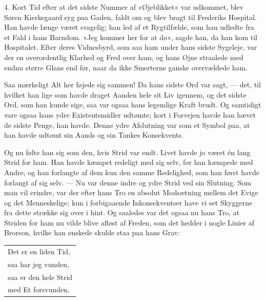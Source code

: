 \documentclass[12pt,a4paper,openany]{book}
\newcommand{\opage}[1]{\marginnote{\footnotesize\textit{[#1]}}}
\begin{document}
4. Kort Tid efter at det sidste Nummer af »Øjeblikket«
var udkommet, blev Søren Kierkegaard syg paa
Gaden, faldt om og blev bragt til Frederiks Hospital.
Han havde længe været svagelig; han led af et Rygtilfælde,
som han udledte fra et Fald i hans Barndom.
»Jeg kommer her for at dø«, sagde han, da han kom til
Hospitalet. Efter deres Vidnesbyrd, som saa ham under
hans sidste Sygeleje, var der en overordentlig Klarhed
og Fred over ham, og hans Øjne straalede med endnu
\opage{149}større Glans end før, naar da ikke Smerterne ganske
overvældede ham.

Saa mærkeligt Alt her føjede sig sammen! Da hans
sidste Ord var sagt, --- det, til hvilket han lige som
havde draget Aanden hele sit Liv igennem, og det sidste
Ord, som han kunde sige, saa var ogsaa hans legemlige
Kraft brudt. Og samtidigt vare ogsaa hans ydre Existentsmidler
udtømte; kort i Forvejen havde han hævet de
sidste Penge, han havde. Denne ydre Afslutning var
som et Symbol paa, at han havde udtømt sin Aands og
sin Tankes Konsekvents.

Og nu følte han sig som den, hvis Strid var endt.
Livet havde jo været én lang Strid for ham. Han havde
kæmpet redeligt med sig selv, før han kæmpede med
Andre, og han forlangte af dem kun den samme Redelighed,
som han først havde forlangt af sig selv. --- Nu
var denne indre og ydre Strid ved sin Slutning. Som
man vil erindre, var der efter hans Tro en absolut Modsætning
mellem det Evige og det Menneskelige; kun i
forbigaaende Inkonsekventser have vi set Skyggerne fra
dette strække sig over i hint. Og saaledes var det ogsaa
nu hans Tro, at Striden for ham nu vilde blive afløst
af Freden, som det hedder i nogle Linier af Brorson,
hvilke han ønskede skulde staa paa hans Grav:
\begin{center}\small\begin{tabular}{@{}l@{}}
Det er en liden Tid,\\
saa har jeg vunden,\\
saa er den hele Strid\\
med Et forsvunden.
\end{tabular}\end{center}
\end{document}
